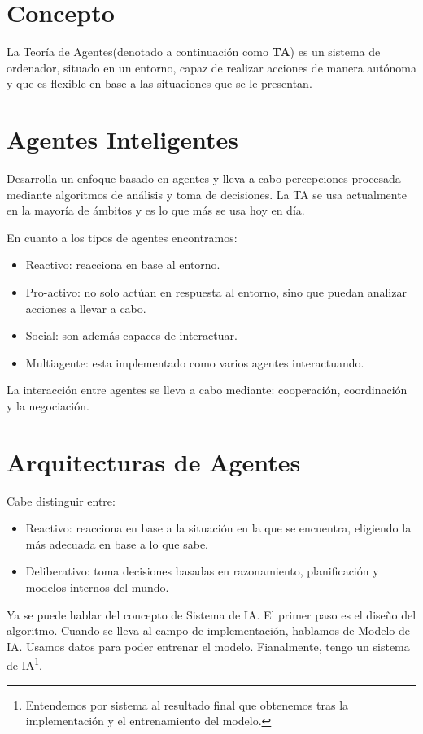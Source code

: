 \section{Concepto}
La Teoría de Agentes(denotado a continuación como \textbf{TA}) es un sistema de ordenador, situado en un entorno, capaz de realizar acciones de manera autónoma y que es flexible en base a las situaciones que se le presentan.

\section{Agentes Inteligentes}

Desarrolla un enfoque basado en agentes y lleva a cabo percepciones procesada mediante algoritmos de análisis y toma de decisiones. 
La TA se usa actualmente en la mayoría de ámbitos y es lo que más se usa hoy en día.

En cuanto a los tipos de agentes encontramos:

\begin{itemize}
    \item Reactivo: reacciona en base al entorno.
    \item Pro-activo: no solo actúan en respuesta al entorno, sino que puedan analizar acciones a llevar a cabo.
    \item  Social: son además capaces de interactuar.
    \item Multiagente: esta implementado como varios agentes interactuando.
\end{itemize}

La interacción entre agentes se lleva a cabo mediante: cooperación, coordinación y la negociación.


\section{Arquitecturas de Agentes}

Cabe distinguir entre:

\begin{itemize}
    \item Reactivo: reacciona en base a la situación en la que se encuentra, eligiendo la más adecuada en base a lo que sabe.
    \item Deliberativo: toma decisiones basadas en razonamiento, planificación y modelos internos del mundo.
\end{itemize}

Ya se puede hablar del concepto de Sistema de IA. El primer paso es el diseño del algoritmo. Cuando se lleva al campo de implementación, hablamos de Modelo de IA. Usamos datos para poder entrenar el modelo. Fianalmente, tengo un sistema de IA\footnote{Entendemos por sistema al resultado final que obtenemos tras la implementación y el entrenamiento del modelo.}.

